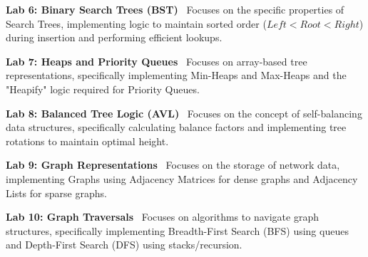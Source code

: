 \vspace{0.2cm}

\noindent\textbf{Lab 6: Binary Search Trees (BST)} \
Focuses on the specific properties of Search Trees, implementing logic to maintain sorted order ($Left < Root < Right$) during insertion and performing efficient lookups. \\

\vspace{0.2cm}

\noindent\textbf{Lab 7: Heaps and Priority Queues} \
Focuses on array-based tree representations, specifically implementing Min-Heaps and Max-Heaps and the "Heapify" logic required for Priority Queues. \\

\vspace{0.2cm}

\noindent\textbf{Lab 8: Balanced Tree Logic (AVL)} \
Focuses on the concept of self-balancing data structures, specifically calculating balance factors and implementing tree rotations to maintain optimal height. \\

\vspace{0.2cm}

\noindent\textbf{Lab 9: Graph Representations} \
Focuses on the storage of network data, implementing Graphs using Adjacency Matrices for dense graphs and Adjacency Lists for sparse graphs. \\

\vspace{0.2cm}

\noindent\textbf{Lab 10: Graph Traversals} \
Focuses on algorithms to navigate graph structures, specifically implementing Breadth-First Search (BFS) using queues and Depth-First Search (DFS) using stacks/recursion.

\newpage
{}